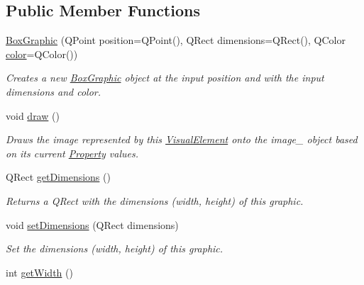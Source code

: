 \subsection*{Public Member Functions}
\begin{DoxyCompactItemize}
\item 
\hyperlink{class_picto_1_1_box_graphic_a4ba531fde3b68da1ca69c6832b781974}{Box\-Graphic} (Q\-Point position=Q\-Point(), Q\-Rect dimensions=Q\-Rect(), Q\-Color \hyperlink{struct_picto_1_1_visual_element_a45c3042c969717eb2ab60373369c7de7}{color}=Q\-Color())
\begin{DoxyCompactList}\small\item\em Creates a new \hyperlink{class_picto_1_1_box_graphic}{Box\-Graphic} object at the input position and with the input dimensions and color. \end{DoxyCompactList}\item 
\hypertarget{class_picto_1_1_box_graphic_a4eec0455468ceee4fc5a25da1fd018be}{void \hyperlink{class_picto_1_1_box_graphic_a4eec0455468ceee4fc5a25da1fd018be}{draw} ()}\label{class_picto_1_1_box_graphic_a4eec0455468ceee4fc5a25da1fd018be}

\begin{DoxyCompactList}\small\item\em Draws the image represented by this \hyperlink{struct_picto_1_1_visual_element}{Visual\-Element} onto the image\-\_\- object based on its current \hyperlink{class_picto_1_1_property}{Property} values. \end{DoxyCompactList}\item 
Q\-Rect \hyperlink{class_picto_1_1_box_graphic_a74806b26442d9d3cd4224891108920ec}{get\-Dimensions} ()
\begin{DoxyCompactList}\small\item\em Returns a Q\-Rect with the dimensions (width, height) of this graphic. \end{DoxyCompactList}\item 
void \hyperlink{class_picto_1_1_box_graphic_a3fbbecdd56c36017d40e9c979f48a1af}{set\-Dimensions} (Q\-Rect dimensions)
\begin{DoxyCompactList}\small\item\em Set the dimensions (width, height) of this graphic. \end{DoxyCompactList}\item 
\hypertarget{class_picto_1_1_box_graphic_a1ec707d81b6cf5918dd8a8367e26a583}{int \hyperlink{class_picto_1_1_box_graphic_a1ec707d81b6cf5918dd8a8367e26a583}{get\-Width} ()}\label{class_picto_1_1_box_graphic_a1ec707d81b6cf5918dd8a8367e26a583}


\end{DoxyCompactItemize}
